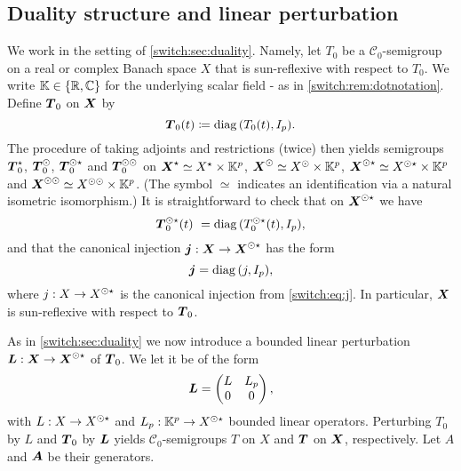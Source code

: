\subsection{Duality structure and linear perturbation}\label{switch:sec:pd:duality}
We work in the setting of \cref{switch:sec:duality}. Namely, let $T_0$ be a $\mathcal{C}_0$-semigroup on a real or complex Banach space $X$ that is sun-reflexive with respect to $T_0$. We write $\mathbb{K} \in \{\mathbb{R}, \mathbb{C}\}$ for the underlying scalar field - as in \cref{switch:rem:dotnotation}. Define $\boldsymbol{T}_0$ on $\boldsymbol{X}$ by
\begin{equation}
  \label{switch:eq:T0_bold}
  \boldsymbol{T}_0(t) \coloneqq \operatorname{diag}{(T_0(t), I_p)}.
\end{equation}
The procedure of taking adjoints and restrictions (twice) then yields semigroups $\boldsymbol{T}_0^{\star}$, $\boldsymbol{T}_0^{\odot}$, $\boldsymbol{T}_0^{\odot\star}$ and $\boldsymbol{T}_0^{\odot\odot}$ on $\boldsymbol{X}^{\star} \simeq X^{\star} \times \mathbb{K}^p$, $\boldsymbol{X}^{\odot} \simeq X^{\odot} \times \mathbb{K}^p$, $\boldsymbol{X}^{\odot\star} \simeq X^{\odot\star} \times \mathbb{K}^p$ and $\boldsymbol{X}^{\odot\odot} \simeq X^{\odot\odot} \times \mathbb{K}^p$. (The symbol $\simeq$ indicates an identification via a natural isometric isomorphism.) It is straightforward to check that on $\boldsymbol{X}^{\odot\star}$ we have
%
\begin{equation}
  \label{switch:eq:T0_sun_star_bold}
  \boldsymbol{T}_0^{\odot\star}(t) \ = \operatorname{diag}{(T_0^{\odot\star}(t), I_p)},
\end{equation}
%
and that the canonical injection $\boldsymbol{j} : \boldsymbol{X} \to \boldsymbol{X}^{\odot\star}$ has the form
%
\begin{equation}
  \label{switch:eq:j_bold}
  \boldsymbol{j} = \operatorname{diag}{(j, I_p)},
\end{equation}
%
where $j : X \to X^{\odot\star}$ is the canonical injection from \cref{switch:eq:j}. In particular, $\boldsymbol{X}$ is sun-reflexive with respect to $\boldsymbol{T}_0$.

As in \cref{switch:sec:duality} we now introduce a bounded linear perturbation $\boldsymbol{L} : \boldsymbol{X} \to \boldsymbol{X}^{\odot\star}$ of $\boldsymbol{T}_0$. We let it be of the form
%
\begin{equation}
  \label{switch:eq:B_bold}
  \boldsymbol{L} =
  \begin{pmatrix}
    L& L_p\\
    0& 0
  \end{pmatrix},
\end{equation}
%
with $L : X \to X^{\odot\star}$ and $L_p : \mathbb{K}^p \to X^{\odot\star}$ bounded linear operators. Perturbing $T_0$ by $L$ and $\boldsymbol{T}_0$ by $\boldsymbol{L}$ yields $\mathcal{C}_0$-semigroups $T$ on $X$ and $\boldsymbol{T}$ on $\boldsymbol{X}$, respectively. Let $A$ and $\boldsymbol{A}$ be their generators.

